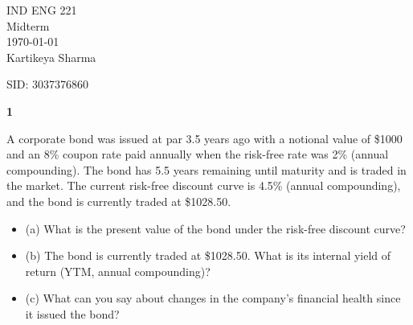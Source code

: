 \documentclass[12pt,letterpaper, onecolumn]{exam}
\begin{document}
\newenvironment{question}[1]{\noindent\textbf{#1}\par}{\par}
\begingroup  
    \centering
    \LARGE IND ENG 221\\
    \LARGE Midterm\\[0.5em]
    \large \today\\[0.5em]
    \large Kartikeya Sharma\par
    \large SID: 3037376860\par
\endgroup

\pointsdroppedatright   %
\printanswers
\renewcommand{\solutiontitle}{\noindent\textbf{Ans:}\enspace}   %

\begin{question} 1
A corporate bond was issued at par 3.5 years ago with a notional value of \$1000 and an 8\% coupon rate paid annually when the risk-free rate was 2\% (annual compounding). The bond has 5.5 years remaining until maturity and is traded in the market. The current risk-free discount curve is 4.5\% (annual compounding), and the bond is currently traded at \$1028.50.

\begin{itemize}
    \item (a) What is the present value of the bond under the risk-free discount curve?
    \item (b) The bond is currently traded at \$1028.50. What is its internal yield of return (YTM, annual compounding)?
    \item (c) What can you say about changes in the company’s financial health since it issued the bond?
\end{itemize}
\end{question}
\end{document}
